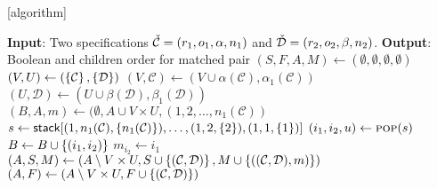 \makeatletter
{}[algorithm]
\newlength{\phaserulewidth}
\newcommand{\setphaserulewidth}{\setlength{\phaserulewidth}}
\newcommand{\phase}[1]{%
  \vspace{-1.25ex}
  \Statex\leavevmode\llap{\rule{\dimexpr\labelwidth+\labelsep}{\phaserulewidth}}\rule{\linewidth}{\phaserulewidth}
  \Statex\strut\refstepcounter{phase}\textit{Phase~\thephase~--~#1}%
  \vspace{-1.25ex}\Statex\leavevmode\llap{\rule{\dimexpr\labelwidth+\labelsep}{\phaserulewidth}}\rule{\linewidth}{\phaserulewidth}}
\makeatother

\setphaserulewidth{.7pt}

\begin{algorithmic}[1]
\Statex \textbf{Input}: Two specifications $\check{\mathcal{C}} = (r_1,o_1,\alpha,n_1)$ and $\check{\mathcal{D}} = (r_2,o_2,\beta,n_2)$.
\Statex \textbf{Output}: Boolean and children order for matched pair
\State $(S,F,A,M) \gets (\emptyset,\emptyset,\emptyset,\emptyset)$ 
        \State{}
    \EndIf
        \State{}
    \EndIf
    \State $(V,U) \gets \left(\left\{\mathcal{C}\right\}, \left\{\mathcal{D}\right\}\right)$
        \State $\left(V, \mathcal{C}\right) \gets \left(V \cup \alpha(\mathcal{C}), \alpha_1(\mathcal{C})\right)$
    \EndWhile
        \State $\left(U, \mathcal{D}\right) \gets \left(U \cup \beta(\mathcal{D}), \beta_1(\mathcal{D})\right)$
    \EndWhile
        \State {}
    \EndIf
        \State {}
    \EndIf
    \State $(B,A,m) \gets (\emptyset, A \cup V \times U, (1,2,\ldots,n_1(\mathcal{C}))$
    \State $s \gets \textsf{stack}[(1,n_1(\mathcal{C}),\left\{n_1(\mathcal{C})\right\}),\dotsc,(1,2,\left\{2\right\}),(1,1,\left\{1\right\})]$
        \State $(i_1,i_2,u) \gets \Call{pop}{s}$
            \State $B \gets B \cup \left\{(i_1,i_2)\right\}$
            \State \algorithmiccontinue
        \EndIf
        \State $m_{i_2} \gets i_1$
            \State $(A,S,M) \gets \left(A \setminus V \times U, S \cup \left\{(\mathcal{C}, \mathcal{D})\right\}, M \cup \left\{((\mathcal{C}, \mathcal{D}), m)\right\}\right)$
            \State{}
        \EndIf
            \State {}
        \EndFor
    \EndWhile
    \State $(A, F) \gets \left(A \setminus V \times U, F \cup \left\{(\mathcal{C}, \mathcal{D})\right\}\right)$
    \State{}
\EndProcedure
\State{}
\end{algorithmic}